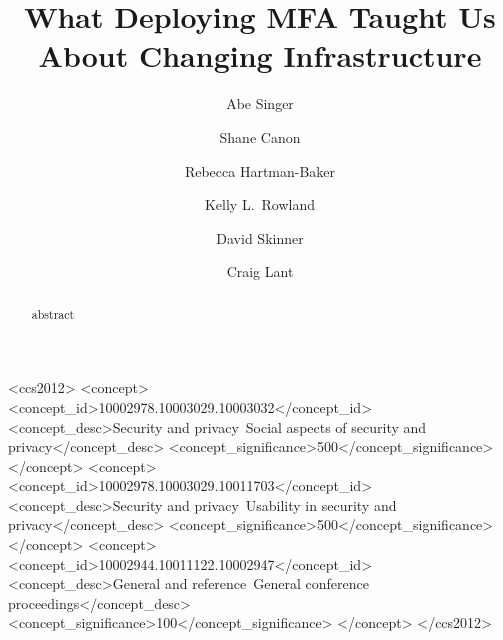 \documentclass[sigconf,review]{acmart}
\begin{document}
\title{What Deploying MFA Taught Us About Changing Infrastructure}

\author{Abe Singer}

\author{Shane Canon}

\author{Rebecca Hartman-Baker}

\author{Kelly L.\ Rowland}

\author{David Skinner}

\author{Craig Lant}

\begin{abstract}

abstract

\end{abstract}

\begin{CCSXML}
<ccs2012>
<concept>
<concept_id>10002978.10003029.10003032</concept_id>
<concept_desc>Security and privacy~Social aspects of security and privacy</concept_desc>
<concept_significance>500</concept_significance>
</concept>
<concept>
<concept_id>10002978.10003029.10011703</concept_id>
<concept_desc>Security and privacy~Usability in security and privacy</concept_desc>
<concept_significance>500</concept_significance>
</concept>
<concept>
<concept_id>10002944.10011122.10002947</concept_id>
<concept_desc>General and reference~General conference proceedings</concept_desc>
<concept_significance>100</concept_significance>
</concept>
</ccs2012>
\end{CCSXML}



\maketitle
\end{document}
